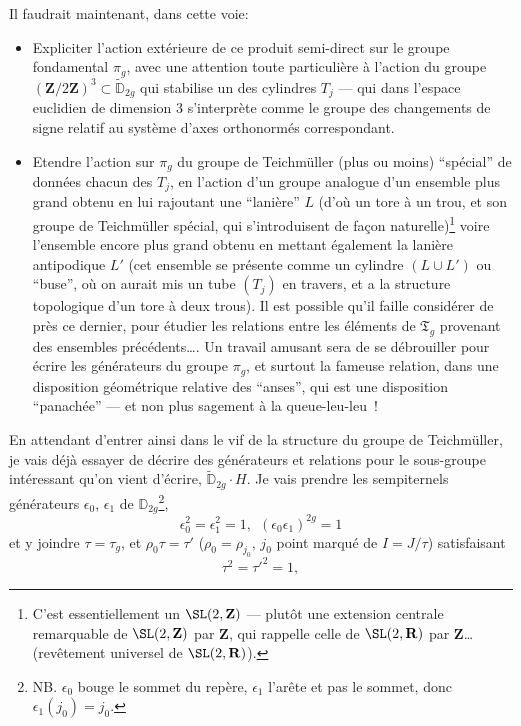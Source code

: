 Il faudrait maintenant, dans cette voie:
\begin{itemize}
	\item[1)] Expliciter l'action extérieure de ce produit semi-direct sur le groupe fondamental $\pi_g$, avec une attention toute particulière à l'action du groupe $({\mathbf{Z}}/2{\mathbf{Z}})^3\subset\widetilde{\mathbb{D}}_{2g}$ qui stabilise un des cylindres $T_j$ --- qui dans l'espace euclidien de dimension $3$ s'interprète comme le groupe des changements de signe relatif au système d'axes orthonormés correspondant.
	\item[2)] Etendre l'action sur $\pi_g$ du groupe de Teichmüller (plus ou moins) ``spécial'' de données chacun des $T_j$, en l'action d'un groupe analogue d'un ensemble plus grand obtenu en lui rajoutant une ``lanière'' $L$ (d'où un tore à un trou, et son groupe de Teichmüller spécial, qui s'introduisent de fa\c{c}on naturelle)\footnote{C'est essentiellement un ${\SL}(2,{\mathbf{Z}})$ --- plutôt une extension centrale remarquable de ${\SL}(2,{\mathbf{Z}})$ par ${\mathbf{Z}}$, qui rappelle celle de ${\SL}(2,{\mathbf{R}})$ par ${\mathbf{Z}}$\dots(revêtement universel de ${\SL}(2,{\mathbf{R}})$).} voire l'ensemble encore plus grand obtenu en mettant également la lanière antipodique $L'$ (cet ensemble se présente comme un cylindre $(L \cup L')$ ou ``buse'', où on aurait mis un tube $(T_j)$ en travers, et a la structure topologique d'un tore à deux trous). Il est possible qu'il faille considérer de près ce dernier, pour étudier les relations entre les éléments de $\mathfrak{T}_g$ provenant des ensembles précédents\dots. Un travail amusant sera de se débrouiller pour écrire les générateurs du groupe $\pi_g$, et surtout la fameuse relation, dans une disposition géométrique relative des ``anses'', qui est une disposition ``panachée'' --- et non plus sagement à la queue-leu-leu~!
\end{itemize}
En attendant d'entrer ainsi dans le vif de la structure du groupe de Teichmüller, je vais déjà essayer de décrire des générateurs et relations pour le sous-groupe intéressant qu'on vient d'écrire, $\widetilde{\mathbb{D}}_{2g} \cdot {H}$. Je vais prendre les sempiternels générateurs $\epsilon_0$, $\epsilon_1$ de $\mathbb{D}_{2g}$\footnote{NB. $\epsilon_0$ bouge le sommet du repère, $\epsilon_1$ l'arête et pas le sommet, donc $\epsilon_1(j_0)=j_0$.},
$$
\epsilon_0^2=\epsilon_1^2=1,\ \ (\epsilon_0\epsilon_1)^{2g}=1
$$
et y joindre $\tau=\tau_g$, et $\rho_0\tau=\tau'$ ($\rho_0= \rho_{j_0}$, $j_0$ point marqué de $I=J/\tau$) satisfaisant
$$
\tau^2={\tau'}^2=1,
$$

